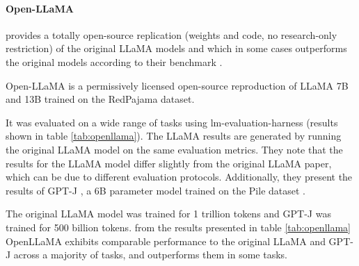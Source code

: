 \documentclass[a4paper,12pt]{article}
\begin{document}
\paragraph*{Open-LLaMA} \cite{openllama} provides a totally open-source replication (weights and code, no research-only restriction) of the original LLaMA \cite{llama} models 
and which in some cases outperforms the original models according to their benchmark \cite{openllama}.

Open-LLaMA is a permissively licensed open-source reproduction of LLaMA \cite{llama} 7B and 13B trained on the RedPajama \cite{redpajama} dataset. 

It was evaluated on a wide range of tasks using lm-evaluation-harness \cite{eval-harness} (results shown in table \ref*{tab:openllama}). 
The LLaMA \cite{llama} results are generated by running the original LLaMA model on the same evaluation metrics. 
They note that the results for the LLaMA model differ slightly from the original LLaMA paper, which can be due to different evaluation protocols. 
Additionally, they present the results of GPT-J \cite{gptj}, a 6B parameter model trained on the Pile dataset \cite{pile}.

The original LLaMA model was trained for 1 trillion tokens and GPT-J was trained for 500 billion tokens. from the results presented in table \ref*{tab:openllama} 
OpenLLaMA exhibits comparable performance to the original LLaMA \cite{llama} and GPT-J \cite{gptj} across a majority of tasks, and outperforms them in some tasks.
\end{document}
